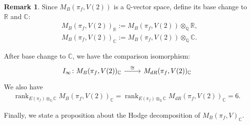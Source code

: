 \documentclass[11pt, a4paper]{amsart}
\theoremstyle{plain}
\theoremstyle{definition}
\newtheorem{remark}[theorem]{Remark}
\numberwithin{equation}{section}
\def\CC{\mathbb{C}}
\def\QQ{\mathbb{Q}}
\def\RR{\mathbb{R}}
\DeclareMathOperator{\rank}{rank}
\begin{document}
\begin{remark}
    Since $M_{B}(\pi_{f}, V(2))$ is a $\QQ$-vector space, define its base change to $\RR$ and $\CC$: 
    \begin{align*}
        & M_{B}(\pi_{f}, V(2))_{\RR} := M_{B}(\pi_{f}, V(2)) \otimes_{\QQ} \RR, \\
        & M_{B}(\pi_{f}, V(2))_{\CC} := M_{B}(\pi_{f}, V(2)) \otimes_{\QQ} \CC. 
    \end{align*}
\end{remark}

After base change to $\CC$, we have the comparison isomorphism: 
\begin{equation*}
    \begin{tikzcd}
        I_{\infty}\colon M_{B}(\pi_{f}, V(2))_{\CC} \ar[r, "{\cong}"] &  M_{dR}(\pi_{f}, V(2))_{\CC} 
    \end{tikzcd}
\end{equation*}
We also have 
\begin{align*}
    \rank_{E(\pi_f) \otimes_{\QQ} \CC}M_{B}(\pi_{f}, V(2))_{\CC} = \rank_{E(\pi_f) \otimes_{\QQ} \CC}M_{dR}(\pi_{f}, V(2))_{\CC} = 6. 
\end{align*}

Finally, we state a proposition about the Hodge decomposition of $M_{B}(\pi_{f}, V)_{\CC}$. 
\end{document}
